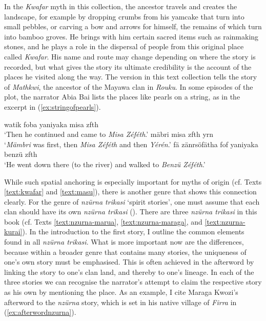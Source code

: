 In the \textit{Kwafar} myth in this collection, the ancestor travels and creates the landscape, for example by dropping crumbs from his yamcake that turn into small pebbles, or carving a bow and arrows for himself, the remains of which turn into bamboo groves. He brings with him certain sacred items such as rainmaking stones, and he plays a role in the dispersal of people from this original place called \textit{Kwafar}. His name and route may change depending on where the story is recorded, but what gives the story its ultimate credibility is the account of the places he visited along the way. The version in this text collection tells the story of \textit{Mathkwi}, the ancestor of the Mayawa clan in \textit{Rouku}. In some episodes of the plot, the narrator Abia Bai lists the places like pearls on a string, as in the excerpt in (\ref{ex:stringofpearls}).

\ea\label{ex:stringofpearls}
    \ea
        watik foba yaniyaka misa zfth\\
        \glt `Then he continued and came to \textit{Misa Zéféth}.'
    \ex
        mäbri misa zfth yrn\\
        \glt `\textit{Mämbri} was first, then \textit{Misa Zéféth} and then \textit{Yérén}.'
    \ex
        fä zänrsöfätha fof yaniyaka benzü zfth\\
        \glt `He went down there (to the river) and walked to \textit{Benzü Zéféth}.'
\z
\z

While such spatial anchoring is especially important for myths of origin (cf. Texts \ref{text:kwafar} and \ref{text:masu}), there is another genre that shows this connection clearly. For the genre of \textit{nzürna trikasi} ‘spirit stories’, one must assume that each clan should have its own \textit{nzürna trikasi} (\cite{Dohler:2025hy}). There are three \textit{nzürna trikasi} in this book (cf. Texts \ref{text:nzurna-marua}, \ref{text:nzurna-maraga}, and \ref{text:nzurna-kurai}). In the introduction to the first story, I outline the common elements found in all \textit{nzürna trikasi}. What is more important now are the differences, because within a broader genre that contains many stories, the uniqueness of one's own story must be emphasised. This is often achieved in the afterword by linking the story to one's clan land, and thereby to one's lineage. In each of the three stories we can recognise the narrator's attempt to claim the respective story as his own by mentioning the place. As an example, I cite Maraga Kwozi's afterword to the \textit{nzürna} story, which is set in his native village of \textit{Firra} in (\ref{ex:afterwordnzurna}).


